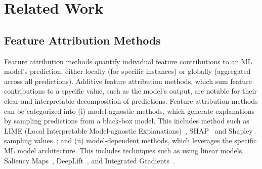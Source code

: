\section{Related Work}
\subsection{Feature Attribution Methods}

Feature attribution methods quantify individual feature contributions to an ML model’s prediction, either locally (for specific instances) or globally (aggregated across all predictions). Additive feature attribution methods, which sum feature contributions to a specific value, such as the model’s output, are notable for their clear and interpretable decomposition of predictions.
Feature attribution methods can be categorized into (i) model-agnostic methods, which generate explanations by sampling predictions from a black-box model. This includes method such as LIME (Local Interpretable Model-agnostic Explanations)~\cite{ribeiro2016should, dieber2020model, salih2024perspective,nguyen2021evaluation}, SHAP~\cite{lundberg2017unified, salih2024perspective,nguyen2021evaluation} and Shapley sampling values~\cite{strumbelj2014}; and (ii) model-dependent methods, which leverages the specific ML model architecture. This includes techniques such as using linear models, Saliency Maps~\cite{simonyan2013deep, mundhenk2019efficient, samuel2021evaluation, alqaraawi2020evaluating}, DeepLift~\cite{shrikumar2017learning, shrikumar2016not}, and Integrated Gradients~\cite{sundararajan2017axiomatic, vcik2021explaining, singh2023choose,wang2024gradient}.

